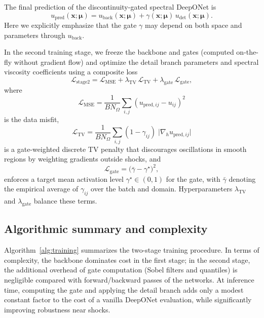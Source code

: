 \documentclass[a4paper,fleqn]{cas-dc}
\begin{document}
The final prediction of the discontinuity-gated spectral DeepONet is
\begin{equation}
  u_{\mathrm{pred}}(\mathbf{x};\boldsymbol{\mu})
  = u_{\mathrm{back}}(\mathbf{x};\boldsymbol{\mu})
  + \gamma(\mathbf{x};\boldsymbol{\mu})\, u_{\mathrm{det}}(\mathbf{x};\boldsymbol{\mu}).
  \label{eq:full_prediction}
\end{equation}
Here we explicitly emphasize that the gate $\gamma$ may depend on both space and parameters through $u_{\mathrm{back}}$.

In the second training stage, we freeze the backbone and gates (computed on-the-fly without gradient flow) and optimize the detail branch parameters and spectral viscosity coefficients using a composite loss
\begin{equation}
  \mathcal{L}_{\mathrm{stage2}}
  = \mathcal{L}_{\mathrm{MSE}}
  + \lambda_{\mathrm{TV}}\, \mathcal{L}_{\mathrm{TV}}
  + \lambda_{\mathrm{gate}}\, \mathcal{L}_{\mathrm{gate}},
\end{equation}
where
\begin{equation}
  \mathcal{L}_{\mathrm{MSE}}
  = \frac{1}{BN_\Omega} \sum_{i,j}
    \left( u_{\mathrm{pred},ij} - u_{ij} \right)^2
\end{equation}
is the data misfit,
\begin{equation}
  \mathcal{L}_{\mathrm{TV}}
  = \frac{1}{BN_\Omega} \sum_{i,j}
    (1-\gamma_{ij})\; \big|\nabla_h u_{\mathrm{pred},ij}\big|
\end{equation}
is a gate-weighted discrete TV penalty that discourages oscillations in smooth regions by weighting gradients outside shocks, and
\begin{equation}
  \mathcal{L}_{\mathrm{gate}}
  = \big(\bar{\gamma} - \gamma^\star\big)^2,
\end{equation}
enforces a target mean activation level $\gamma^\star\in(0,1)$ for the gate, with $\bar{\gamma}$ denoting the empirical average of $\gamma_{ij}$ over the batch and domain.
Hyperparameters $\lambda_{\mathrm{TV}}$ and $\lambda_{\mathrm{gate}}$ balance these terms.

\subsection{Algorithmic summary and complexity}

Algorithm~\ref{alg:training} summarizes the two-stage training procedure.
In terms of complexity, the backbone dominates cost in the first stage; in the second stage, the additional overhead of gate computation (Sobel filters and quantiles) is negligible compared with forward/backward passes of the networks.
At inference time, computing the gate and applying the detail branch adds only a modest constant factor to the cost of a vanilla DeepONet evaluation, while significantly improving robustness near shocks.
\end{document}
